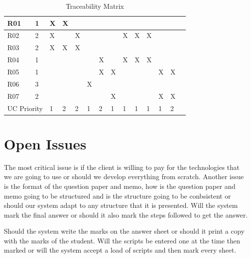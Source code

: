 \documentclass{article}
\begin{document}
\begin{table}[h!]
\begin{tabular}{|l|l|l|l|l|l|l|l|l|l|l|l|l|l|}
R01 & 1 & X & X &   &    &    &    &    &    &    &    &    \\ \hline
R02 & 2 & X &   & X &    &    &    & X  & X  & X  &    &    \\ \hline
R03 & 2 & X & X & X &    &    &    &    &    &    &    &    \\ \hline
R04 & 1 &   &   &   &    & X  &    & X  & X  & X  &    &    \\ \hline
R05 & 1 &   &   &   &    & X  & X  &    &    &    & X  & X  \\ \hline
R06 & 3 &   &   &   & X  &    &    &    &    &    &    &    \\ \hline
R07 & 2 &   &   &   &    &    & X  &    &    &    & X  & X   \\ \hline
\multicolumn{2}{|c|}{UC Priority} & 1 & 2 & 2 & 1 & 2 & 1 & 1 & 1 & 1 & 1 & 2   \\ \hline
\end{tabular}
\caption{Traceability Matrix}
\end{table}

\section{Open Issues}
	 The most critical issue is if the client is willing to pay for the technologies that we are going to use or should we develop everything from scratch. Another issue is the format of the question paper and memo, how is the question paper and memo going to be structured and is the structure going to be conbsistent or should our system adapt to any structure that it is presented. Will the system mark the final answer or should it also mark the steps followed to get the answer. \par
	 Should the system write the marks on the answer sheet or should it print a copy with the marks of the student. Will the scripts be entered one at the time then marked or will the system accept a load of scripts and then mark every sheet. 
\end{document}
